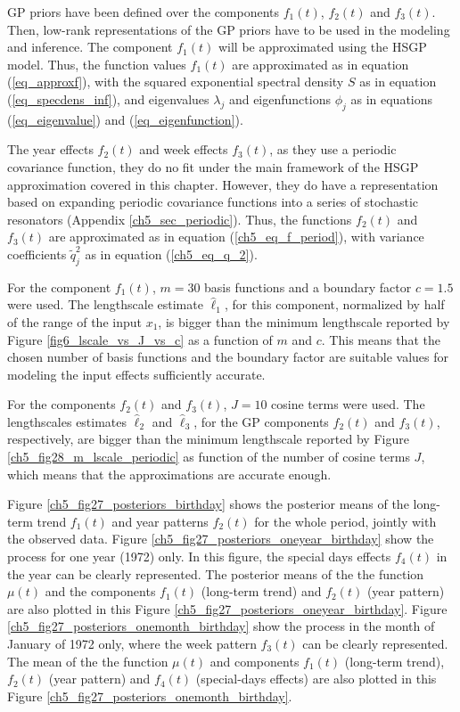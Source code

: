\documentclass[onecolumn,a4paper,11pt]{article}
\begin{document}
GP priors have been defined over the components $f_1(t)$, $f_2(t)$ and $f_3(t)$. Then, low-rank representations of the GP priors have to be used in the modeling and inference. The component $f_1(t)$ will be approximated using the HSGP model. Thus, the function values $f_1(t)$ are approximated as in equation (\ref{eq_approxf}), with the squared exponential spectral density $S$ as in equation (\ref{eq_specdens_inf}), and eigenvalues $\lambda_j$  and eigenfunctions $\phi_j$ as in equations (\ref{eq_eigenvalue}) and (\ref{eq_eigenfunction}). 

The year effects $f_2(t)$ and week effects $f_3(t)$, as they use a periodic covariance function, they do no fit under the main framework of the HSGP approximation covered in this chapter. However, they do have a representation based on expanding periodic covariance functions into a series of stochastic resonators (Appendix \ref{ch5_sec_periodic}). Thus, the functions $f_2(t)$ and $f_3(t)$ are approximated as in equation (\ref{ch5_eq_f_period}), with variance coefficients $\tilde{q}_j^2$ as in equation (\ref{ch5_eq_q_2}).

For the component $f_1(t)$, $m=30$ basis functions and a boundary factor $c=1.5$ were used. The lengthscale estimate $\hat{\ell}_1$, for this component, normalized by half of the range of the input $x_1$, is bigger than the minimum lengthscale reported by Figure \ref{fig6_lscale_vs_J_vs_c} as a function of $m$ and $c$. This means that the chosen number of basis functions and the boundary factor are suitable values for modeling the input effects sufficiently accurate. 

For the components $f_2(t)$ and $f_3(t)$, $J=10$ cosine terms were used. The  lengthscales estimates $\hat{\ell}_2$ and $\hat{\ell}_3$, for the GP components $f_2(t)$ and $f_3(t)$, respectively, are bigger than the minimum lengthscale reported by Figure \ref{ch5_fig28_m_lscale_periodic} as function of the number of cosine terms $J$, which means that the approximations are accurate enough.

Figure \ref{ch5_fig27_posteriors_birthday} shows the posterior means of the long-term trend $f_1(t)$ and year patterns $f_2(t)$ for the whole period, jointly with the observed data. Figure \ref{ch5_fig27_posteriors_oneyear_birthday} show the process for one year (1972) only. In this figure, the special days effects $f_4(t)$ in the year can be clearly represented. The posterior means of the the function $\mu(t)$ and the components $f_1(t)$ (long-term trend) and $f_2(t)$ (year pattern) are also plotted in this Figure \ref{ch5_fig27_posteriors_oneyear_birthday}. Figure \ref{ch5_fig27_posteriors_onemonth_birthday} show the process in the month of January of 1972 only, where the week pattern $f_3(t)$ can be clearly represented. The mean of the the function $\mu(t)$ and components $f_1(t)$ (long-term trend), $f_2(t)$ (year pattern) and $f_4(t)$ (special-days effects) are also plotted in this Figure \ref{ch5_fig27_posteriors_onemonth_birthday}. 
\end{document}
